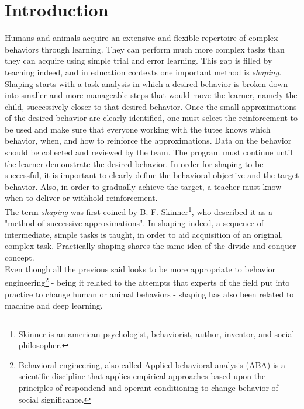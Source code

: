 \chapter{Introduction}
Humans and animals acquire an extensive and flexible repertoire of complex behaviors through learning. They can perform
much more complex tasks than they can acquire using simple trial and error learning. 
This gap is filled by teaching indeed, and in education contexts one important method is \textit{shaping}. Shaping starts with a task analysis in which a desired
behavior is broken down into smaller and more manageable steps that would move the learner, namely the child, successively closer to that desired behavior. Once the small approximations of the desired behavior are clearly
identified, one must select the reinforcement to be used and make sure that everyone working with the tutee knows which behavior, when, and how to reinforce the approximations.
Data on the behavior should be collected and reviewed by the team. The program must continue until the learner demonstrate the desired behavior.
In order for shaping to be successful, it is important to clearly define the behavioral objective and the target behavior. Also, in order to gradually achieve the target, 
a teacher must know when to deliver or withhold reinforcement. \\
The term \textit{shaping} was first coined 
by B. F. Skinner\footnote{Skinner is an american psychologist, behaviorist, author, inventor, and social philosopher.}, 
who described it as a "method of successive approximations". In shaping indeed, a sequence of intermediate, simple tasks is taught, in order to aid acquisition of an original,
complex task. Practically shaping shares the same idea of the divide-and-conquer concept.\\
Even though all the previous said looks to be more appropriate
to behavior engineering\footnote{Behavioral engineering, also called Applied behavioral analysis (ABA) is a scientific discipline that applies
empirical approaches based upon the principles of respondend and operant conditioning to change behavior of social significance.}
- being it related to the attempts that experts of the field put into practice to change human or animal behaviors - 
shaping has also been related to machine and deep learning.\\

